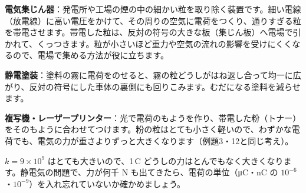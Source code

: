 \begin{phkougaku}
\textbf{電気集じん器}：発電所や工場の煙の中の細かい粒を取り除く装置です。細い電線（放電線）に高い電圧をかけて、その周りの空気に電荷をつくり、通りすぎる粒を帯電させます。帯電した粒は、反対の符号の大きな板（集じん板）へ電場で引かれて、くっつきます。粒が小さいほど重力や空気の流れの影響を受けにくくなるので、電場で集める方法が役に立ちます。

\textbf{静電塗装}：塗料の霧に電荷をのせると、霧の粒どうしがはね返し合って均一に広がり、反対の符号にした車体の裏側にも回りこみます。むだになる塗料を減らせます。

\textbf{複写機・レーザープリンター}：光で電荷のもようを作り、帯電した粉（トナー）をそのもように合わせてつけます。粉の粒はとても小さく軽いので、わずかな電荷でも、電気の力が重さよりずっと大きくなります（例題3・12と同じ考え）。

\begin{phketa}[静電気の数の目安]
$k=9\times10^9$ はとても大きいので、1\,C どうしの力はとんでもなく大きくなります。静電気の問題で、力が何千 N も出てきたら、電荷の単位（\unit{\micro C}・nC の $10^{-6}$・$10^{-9}$）を入れ忘れていないか確かめましょう。
\end{phketa}
\end{phkougaku}

